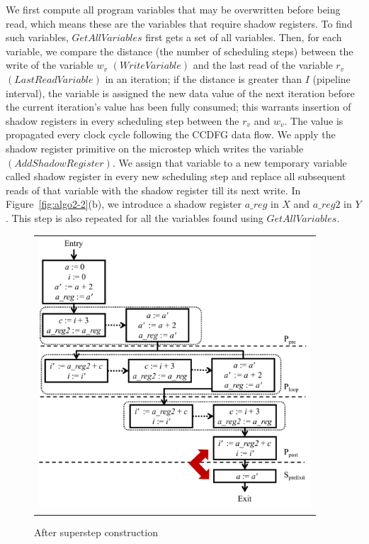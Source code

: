 We first compute all program variables that may be
overwritten before being read, which means these are the variables that require shadow registers. To find such variables,
 $GetAllVariables$ first gets a set of all variables. Then, for each variable, we compare the distance (the number of scheduling steps) between the write of
  the variable $w_v$ $(WriteVariable)$ and the last read of the variable $r_v$ $(LastReadVariable)$ in an iteration; if the
   distance is greater than $I$ (pipeline interval), the variable is assigned the new data value of the next iteration before the current iteration's value
    has been fully consumed; this warrants insertion of shadow registers in every scheduling step between the $r_v$ and $w_v$. The value is propagated every clock cycle following the CCDFG data flow.
We apply the shadow register primitive on the microstep which writes the variable $(AddShadowRegister)$. We assign that
 variable to a new temporary variable called shadow register in every new scheduling step and replace all subsequent reads of that variable with the shadow register till its next write. In Figure~\ref{fig:algo2-2}(b), we introduce a shadow register $a\_reg$ in $X$ and $a\_reg2$ in $Y$. This step is also repeated for all the variables found using $GetAllVariables$.

\begin{figure}[t!]
\begin{center}
\begin{tabular}{c}
\includegraphics[width=4in]{fig-proposal/algorithm-after-superstep-construction}
\end{tabular}
\end{center}
\caption{After superstep construction}
\label{fig:algo3-2}
\end{figure}

